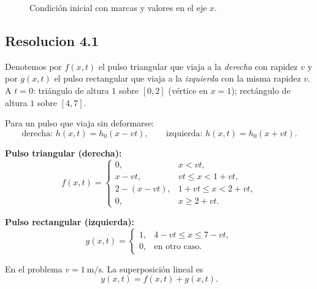 \documentclass[
  11pt,
  letterpaper,
   addpoints,
  ]{exam}
\begin{document}
\begin{questions}
\begin{figure}[h!]
\caption{Condición inicial con marcas y valores en el eje $x$.}
\end{figure}
\begin{solution}

\subsection*{Resolucion 4.1 }

Denotemos por $f(x,t)$ el pulso triangular que viaja a la \emph{derecha} con rapidez $v$ y por $g(x,t)$ el pulso rectangular que viaja a la \emph{izquierda} con la misma rapidez $v$. A $t=0$: triángulo de altura $1$ sobre $[0,2]$ (vértice en $x=1$); rectángulo de altura $1$ sobre $[4,7]$.

Para un pulso que viaja sin deformarse:
\[
\text{derecha: } h(x,t)=h_0(x-vt),\qquad
\text{izquierda: } h(x,t)=h_0(x+vt).
\]

\textbf{Pulso triangular (derecha):}
\begin{equation}
f(x,t)=
\begin{cases}
0, & x<vt,\\[2pt]
x-vt, & vt\le x < 1+vt,\\[2pt]
2-(x-vt), & 1+vt\le x < 2+vt,\\[2pt]
0, & x\ge 2+vt.
\end{cases}
\end{equation}

\textbf{Pulso rectangular (izquierda):}
\begin{equation}
g(x,t)=
\begin{cases}
1, & 4-vt \le x \le 7-vt,\\[2pt]
0, & \text{en otro caso}.
\end{cases}
\end{equation}

En el problema $v=1~\mathrm{m/s}$. La superposición lineal es
\begin{equation}
y(x,t)=f(x,t)+g(x,t).
\end{equation}


\end{solution}
\end{questions}
\end{document}
